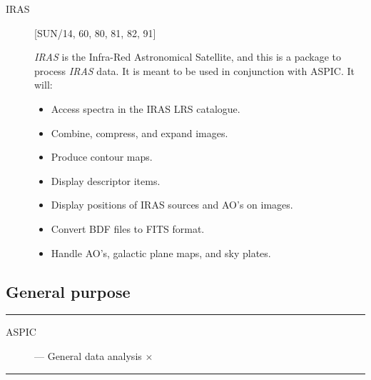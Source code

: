 \begin{description}

\item [IRAS] \hfill [SUN/14, 60, 80, 81, 82, 91]

{\em IRAS} is the Infra-Red Astronomical Satellite, and this is a package to
process {\em IRAS} data.
It is meant to be used in conjunction with ASPIC.
It will:
\begin{itemize}
\item Access spectra in the IRAS LRS catalogue.
\item Combine, compress, and expand images.
\item Produce contour maps.
\item Display descriptor items.
\item Display positions of IRAS sources and AO's on images.
\item Convert BDF files to FITS format.
\item Handle AO's, galactic plane maps, and sky plates.
\end{itemize}

\end{description}

\newpage

\subsection{General purpose}

\rule{\textwidth}{0.5mm}
\begin{description}
\begin{description}
\item [ASPIC] --- General data analysis \hfill $\times$
\end{description}
\end{description}
\rule{\textwidth}{0.5mm}

